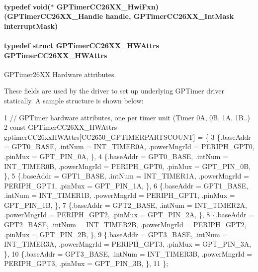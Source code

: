 \paragraph[{G\+P\+Timer\+C\+C26\+X\+X\+\_\+\+Hwi\+Fxn}]{\setlength{\rightskip}{0pt plus 5cm}typedef void($\ast$ G\+P\+Timer\+C\+C26\+X\+X\+\_\+\+Hwi\+Fxn) ({\bf G\+P\+Timer\+C\+C26\+X\+X\+\_\+\+Handle} handle, {\bf G\+P\+Timer\+C\+C26\+X\+X\+\_\+\+Int\+Mask} interrupt\+Mask)}\label{_g_p_timer_c_c26_x_x_8h_a6b9b95974e20f85ccd3f8463fdda84f1}
\paragraph[{G\+P\+Timer\+C\+C26\+X\+X\+\_\+\+H\+W\+Attrs}]{\setlength{\rightskip}{0pt plus 5cm}typedef struct {\bf G\+P\+Timer\+C\+C26\+X\+X\+\_\+\+H\+W\+Attrs}  {\bf G\+P\+Timer\+C\+C26\+X\+X\+\_\+\+H\+W\+Attrs}}\label{_g_p_timer_c_c26_x_x_8h_a415d99f6aca4a4a8bf94a6328021c15c}


G\+P\+Timer26\+X\+X Hardware attributes. 

These fields are used by the driver to set up underlying G\+P\+Timer driver statically. A sample structure is shown below\+:


\begin{DoxyCode}
1 // GPTimer hardware attributes, one per timer unit (Timer 0A, 0B, 1A, 1B..)
2 const GPTimerCC26XX\_HWAttrs gptimerCC26xxHWAttrs[CC2650\_GPTIMERPARTSCOUNT] = \{
3   \{.baseAddr = GPT0\_BASE, .intNum = INT\_TIMER0A, .powerMngrId = PERIPH\_GPT0, .pinMux = GPT\_PIN\_0A, \},
4   \{.baseAddr = GPT0\_BASE, .intNum = INT\_TIMER0B, .powerMngrId = PERIPH\_GPT0, .pinMux = GPT\_PIN\_0B, \},
5   \{.baseAddr = GPT1\_BASE, .intNum = INT\_TIMER1A, .powerMngrId = PERIPH\_GPT1, .pinMux = GPT\_PIN\_1A, \},
6   \{.baseAddr = GPT1\_BASE, .intNum = INT\_TIMER1B, .powerMngrId = PERIPH\_GPT1, .pinMux = GPT\_PIN\_1B, \},
7   \{.baseAddr = GPT2\_BASE, .intNum = INT\_TIMER2A, .powerMngrId = PERIPH\_GPT2, .pinMux = GPT\_PIN\_2A, \},
8   \{.baseAddr = GPT2\_BASE, .intNum = INT\_TIMER2B, .powerMngrId = PERIPH\_GPT2, .pinMux = GPT\_PIN\_2B, \},
9   \{.baseAddr = GPT3\_BASE, .intNum = INT\_TIMER3A, .powerMngrId = PERIPH\_GPT3, .pinMux = GPT\_PIN\_3A, \},
10   \{.baseAddr = GPT3\_BASE, .intNum = INT\_TIMER3B, .powerMngrId = PERIPH\_GPT3, .pinMux = GPT\_PIN\_3B, \},
11 \};
\end{DoxyCode}
